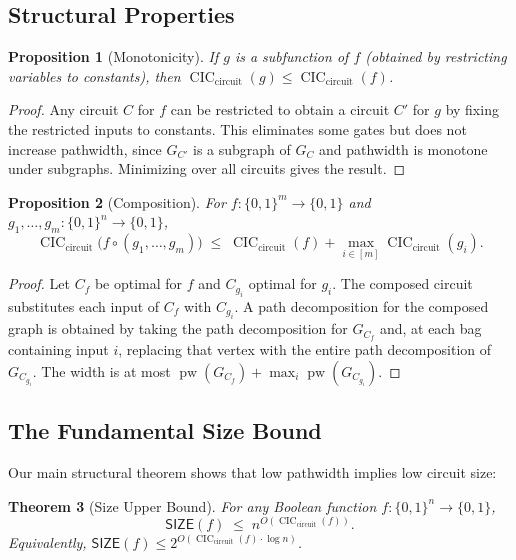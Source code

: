\documentclass[11pt]{article}
\theoremstyle{plain}
\newtheorem{theorem}{Theorem}[section]
\newtheorem{proposition}[theorem]{Proposition}
\theoremstyle{definition}
\newcommand{\pw}{\operatorname{pw}}
\newcommand{\CIC}{\operatorname{CIC}}
\newcommand{\CICcirc}{\CIC_{\text{circuit}}}
\newcommand{\SIZE}{\mathsf{SIZE}}
\newcommand{\set}[1]{\{#1\}}
\begin{document}
\subsection{Structural Properties}

\begin{proposition}[Monotonicity]\label{prop:monotone}
If $g$ is a subfunction of $f$ (obtained by restricting variables to constants), then $\CICcirc(g) \leq \CICcirc(f)$.
\end{proposition}

\begin{proof}
Any circuit $C$ for $f$ can be restricted to obtain a circuit $C'$ for $g$ by fixing the restricted inputs to constants. This eliminates some gates but does not increase pathwidth, since $G_{C'}$ is a subgraph of $G_C$ and pathwidth is monotone under subgraphs. Minimizing over all circuits gives the result.
\end{proof}

\begin{proposition}[Composition]\label{prop:composition}
For $f : \set{0,1}^m \to \set{0,1}$ and $g_1, \ldots, g_m : \set{0,1}^n \to \set{0,1}$,
\[
\CICcirc\bigl(f \circ (g_1, \ldots, g_m)\bigr) \;\leq\; \CICcirc(f) + \max_{i \in [m]} \CICcirc(g_i).
\]
\end{proposition}

\begin{proof}
Let $C_f$ be optimal for $f$ and $C_{g_i}$ optimal for $g_i$. The composed circuit substitutes each input of $C_f$ with $C_{g_i}$. A path decomposition for the composed graph is obtained by taking the path decomposition for $G_{C_f}$ and, at each bag containing input $i$, replacing that vertex with the entire path decomposition of $G_{C_{g_i}}$. The width is at most $\pw(G_{C_f}) + \max_i \pw(G_{C_{g_i}})$.
\end{proof}

\subsection{The Fundamental Size Bound}

Our main structural theorem shows that low pathwidth implies low circuit size:

\begin{theorem}[Size Upper Bound]\label{thm:size-bound}
For any Boolean function $f : \set{0,1}^n \to \set{0,1}$,
\[
\SIZE(f) \;\leq\; n^{O(\CICcirc(f))}.
\]
Equivalently, $\SIZE(f) \leq 2^{O(\CICcirc(f) \cdot \log n)}$.
\end{theorem}
\end{document}
